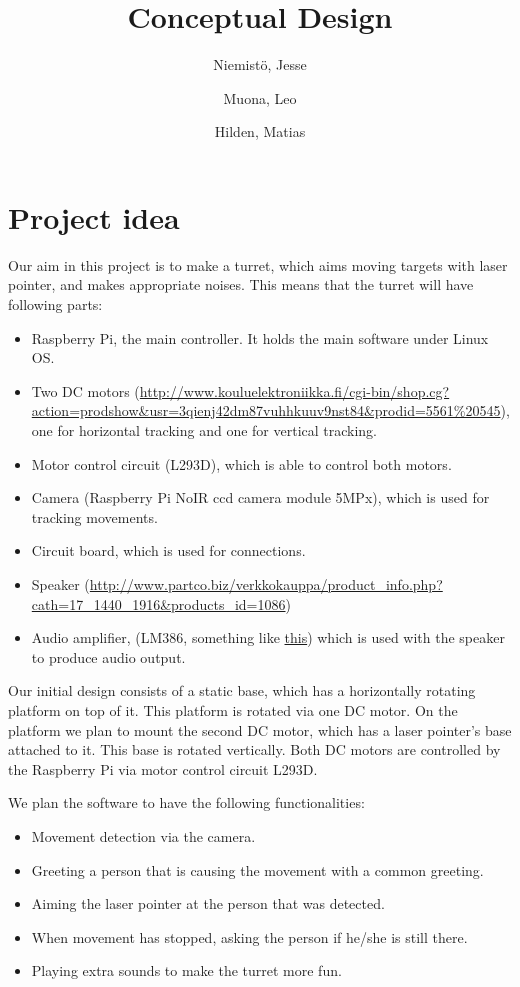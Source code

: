 \documentclass[english,11pt,twoside,a4paper]{article}
\begin{document}
\author{
  Niemistö, Jesse
  \and
  Muona, Leo
  \and
  Hilden, Matias
}
\title{Conceptual Design}

\maketitle

\section{Project idea}

Our aim in this project is to make a turret, which aims moving targets with laser pointer, and makes appropriate noises. This means that the turret will have following parts:

\begin{itemize}
  \item Raspberry Pi, the main controller. It holds the main software under Linux OS.
  \item Two DC motors (\url{http://www.kouluelektroniikka.fi/cgi-bin/shop.cg?action=prodshow\&usr=3qienj42dm87vuhhkuuv9nst84\&prodid=5561\%20545}), one for horizontal tracking and one for vertical tracking.
  \item Motor control circuit (L293D), which is able to control both motors.
  \item Camera (Raspberry Pi NoIR ccd camera module 5MPx), which is used for tracking movements.
  \item Circuit board, which is used for connections.
  \item Speaker (\url{http://www.partco.biz/verkkokauppa/product\_info.php?cath=17\_1440\_1916\&products\_id=1086})
  \item Audio amplifier, (LM386, something like \href{http://www.youtube.com/watch?v=3KyBrAoHMX8}{this}) which is used with the speaker to produce audio output.
\end{itemize}

Our initial design consists of a static base, which has a horizontally rotating platform on top of it. This platform is rotated via one DC motor. On the platform we plan to mount the second DC motor, which has a laser pointer's base attached to it. This base is rotated vertically. Both DC motors are controlled by the Raspberry Pi via motor control circuit L293D.

We plan the software to have the following functionalities:

\begin{itemize}
  \item Movement detection via the camera.
  \item Greeting a person that is causing the movement with a common greeting.
  \item Aiming the laser pointer at the person that was detected.
  \item When movement has stopped, asking the person if he/she is still there.
  \item Playing extra sounds to make the turret more fun.
\end{itemize}
\end{document}

